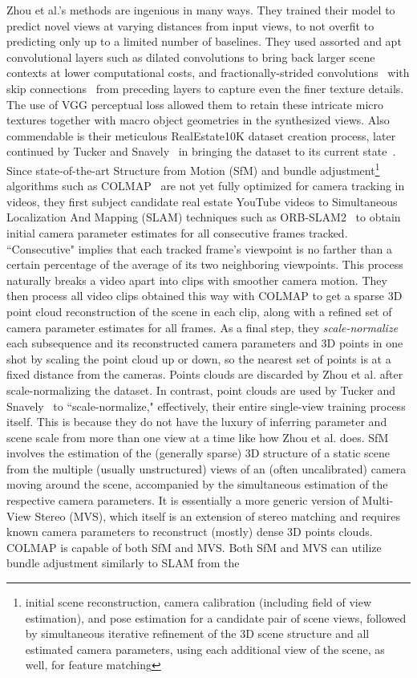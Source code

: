 Zhou et al.'s methods are ingenious in many ways. They trained their model to predict novel views at varying distances from input views, to not overfit to predicting only up to a limited number of baselines. They used assorted and apt convolutional layers such as dilated convolutions to bring back larger scene contexts at lower computational costs, and fractionally-strided convolutions~\cite{prove_introduction_2018} with skip connections~\cite{adaloglou_intuitive_2020} from preceding layers to capture even the finer texture details. The use of VGG perceptual loss allowed them to retain these intricate micro textures together with macro object geometries in the synthesized views. Also commendable is their meticulous RealEstate10K dataset creation process, later continued by Tucker and Snavely~\cite{single_view_mpi} in bringing the dataset to its current state~\cite{zhou2018stereo}. Since state-of-the-art Structure from Motion (SfM) and bundle adjustment\footnote{initial scene reconstruction, camera calibration (including field of view estimation), and pose estimation for a candidate pair of scene views, followed by simultaneous iterative refinement of the 3D scene structure and all estimated camera parameters, using each additional view of the scene, as well, for feature matching} algorithms such as COLMAP~\cite{schoenberger2016sfm,schoenberger2016mvs} are not yet fully optimized for camera tracking in videos, they first subject candidate real estate YouTube videos to Simultaneous Localization And Mapping (SLAM) techniques such as ORB-SLAM2~\cite{mur-artal_orb-slam_2015} to obtain initial camera parameter estimates for all consecutive frames tracked. ``Consecutive" implies that each tracked frame's viewpoint is no farther than a certain percentage of the average of its two neighboring viewpoints. This process naturally breaks a video apart into clips with smoother camera motion. They then process all video clips obtained this way with COLMAP to get a sparse 3D point cloud reconstruction of the scene in each clip, along with a refined set of camera parameter estimates for all frames. As a final step, they \textit{scale-normalize} each subsequence and its reconstructed camera parameters and 3D points in one shot by scaling the point cloud up or down, so the nearest set of points is at a fixed distance from the cameras. Points clouds are discarded by Zhou et al. after scale-normalizing the dataset. In contrast, point clouds are used by Tucker and Snavely~\cite{single_view_mpi} to ``scale-normalize," effectively, their entire single-view training process itself. This is because they do not have the luxury of inferring parameter and scene scale from more than one view at a time like how Zhou et al. does. SfM involves the estimation of the (generally sparse) 3D structure of a static scene from the multiple (usually unstructured) views of an (often uncalibrated) camera moving around the scene, accompanied by the simultaneous estimation of the respective camera parameters. It is essentially a more generic version of Multi-View Stereo (MVS), which itself is an extension of stereo matching and requires known camera parameters to reconstruct (mostly) dense 3D points clouds. COLMAP is capable of both SfM and MVS. Both SfM and MVS can utilize bundle adjustment similarly to SLAM from the 